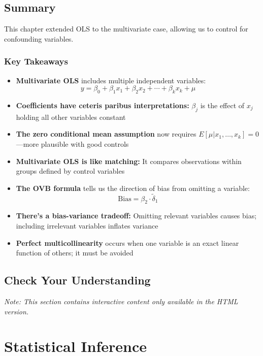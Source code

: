 \documentclass[
  letterpaper,
  DIV=11,
  numbers=noendperiod]{scrreprt}
\begin{document}
\section{Summary}\label{summary-1}

This chapter extended OLS to the multivariate case, allowing us to
control for confounding variables.

\subsection{Key Takeaways}\label{key-takeaways-3}

\begin{itemize}
\item
  \textbf{Multivariate OLS} includes multiple independent variables:
  \[y = \beta_0 + \beta_1 x_1 + \beta_2 x_2 + \cdots + \beta_k x_k + \mu\]
\item
  \textbf{Coefficients have ceteris paribus interpretations:}
  \(\beta_j\) is the effect of \(x_j\) holding all other variables
  constant
\item
  \textbf{The zero conditional mean assumption} now requires
  \(E[\mu | x_1, \ldots, x_k] = 0\)---more plausible with good controls
\item
  \textbf{Multivariate OLS is like matching:} It compares observations
  within groups defined by control variables
\item
  \textbf{The OVB formula} tells us the direction of bias from omitting
  a variable: \[\text{Bias} = \beta_2 \cdot \tilde{\delta}_1\]
\item
  \textbf{There's a bias-variance tradeoff:} Omitting relevant variables
  causes bias; including irrelevant variables inflates variance
\item
  \textbf{Perfect multicollinearity} occurs when one variable is an
  exact linear function of others; it must be avoided
\end{itemize}

\section{Check Your Understanding}\label{check-your-understanding-4}

\emph{Note: This section contains interactive content only available in
the HTML version.}


\chapter{Statistical Inference}\label{sec-inference}
\end{document}
